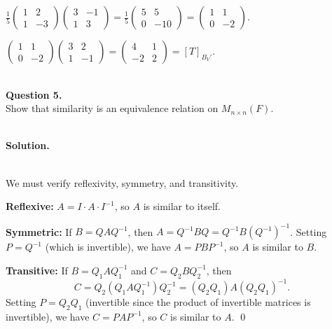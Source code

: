 \documentclass{article}
\begin{document}
\begin{mdframed}[linewidth=1pt]
$\frac{1}{5}\begin{pmatrix} 1 & 2 \\ 1 & -3 \end{pmatrix}\begin{pmatrix} 3 & -1 \\ 1 & 3 \end{pmatrix} = \frac{1}{5}\begin{pmatrix} 5 & 5 \\ 0 & -10 \end{pmatrix} = \begin{pmatrix} 1 & 1 \\ 0 & -2 \end{pmatrix}$.

$\begin{pmatrix} 1 & 1 \\ 0 & -2 \end{pmatrix}\begin{pmatrix} 3 & 2 \\ 1 & -1 \end{pmatrix} = \begin{pmatrix} 4 & 1 \\ -2 & 2 \end{pmatrix} = [T]_{B_V'}$. \checkmark
\end{mdframed}

\bigskip


\hfill \break  $~\!\!$ \dotfill \medskip \\
\textbf{Question 5.}\\
Show that similarity is an equivalence relation on $M_{n \times n}(F)$.

\noindent\\
\textbf{Solution.}\\
\quad\\
\begin{mdframed}[linewidth=1pt]
We must verify reflexivity, symmetry, and transitivity.

\textbf{Reflexive:} $A = I \cdot A \cdot I^{-1}$, so $A$ is similar to itself.

\textbf{Symmetric:} If $B = QAQ^{-1}$, then $A = Q^{-1}BQ = Q^{-1}B(Q^{-1})^{-1}$. Setting $P = Q^{-1}$ (which is invertible), we have $A = PBP^{-1}$, so $A$ is similar to $B$.

\textbf{Transitive:} If $B = Q_1 A Q_1^{-1}$ and $C = Q_2 B Q_2^{-1}$, then
\[
C = Q_2(Q_1 A Q_1^{-1})Q_2^{-1} = (Q_2 Q_1) A (Q_2 Q_1)^{-1}.
\]
Setting $P = Q_2 Q_1$ (invertible since the product of invertible matrices is invertible), we have $C = PAP^{-1}$, so $C$ is similar to $A$. \qed
\end{mdframed}
\end{document}
